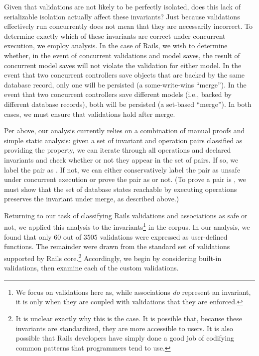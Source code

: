  Given that validations are
not likely to be perfectly isolated, does this lack of serializable
isolation actually affect these invariants?  Just because validations
effectively run concurrently does not mean that they are necessarily
incorrect. To determine exactly which of these invariants are correct
under concurrent execution, we employ \iconfluence analysis. In the
case of Rails, we wish to determine whether, in the event of
concurrent validations and model saves, the result of concurrent model
saves will not violate the validation for either model. In the event
that two concurrent controllers save objects that are backed by the
same database record, only one will be persisted (a some-write-wins
``merge''). In the event that two concurrent controllers save
different models (i.e., backed by different database records), both
will be persisted (a set-based ``merge''). In both cases, we must
ensure that validations hold after merge.

Per above, our \iconfluence analysis currently relies on a combination
of manual proofs and simple static analysis: given a set of invariant
and operation pairs classified as providing the \iconfluence property,
we can iterate through all operations and declared invariants and
check whether or not they appear in the set of \iconfluent pairs. If
so, we label the pair as \iconfluent. If not, we can either
conservatively label the pair as unsafe under concurrent execution or
prove the pair as \iconfluent or not. (To prove a pair is \iconfluent,
we must show that the set of database states reachable by executing
operations preserves the invariant under merge, as described above.)

Returning to our task of classifying Rails validations and
associations as safe or not, we applied this \iconfluence analysis to
the invariants\footnote{We focus on validations here as, while
  associations \textit{do} represent an invariant, it is only when
  they are coupled with validations that they are enforced.} in the
corpus. In our analysis, we
found that only 60 out of 3505 validations were expressed as
user-defined functions. The remainder were drawn from the standard set
of validations supported by Rails core.\footnote{It is unclear exactly
  why this is the case. It is possible that, because these invariants
  are standardized, they are more accessible to users. It is also
  possible that Rails developers have simply done a good job of
  codifying common patterns that programmers tend to use.}
Accordingly, we begin by considering built-in validations, then
examine each of the custom validations.


